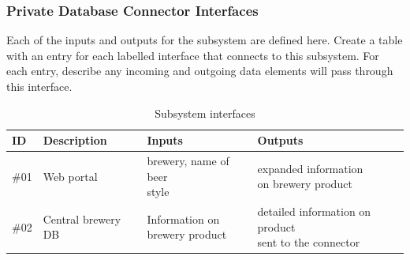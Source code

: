 \subsubsection{Private Database Connector Interfaces}
Each of the inputs and outputs for the subsystem are defined here. Create a table with an entry for each labelled interface that connects to this subsystem. For each entry, describe any incoming and outgoing data elements will pass through this interface.

\begin {table}[H]
\caption {Subsystem interfaces} 
\begin{center}
    \begin{tabular}{ | p{1cm} | p{6cm} | p{3cm} | p{3cm} |}
    \hline
    ID & Description & Inputs & Outputs \\ \hline
    \#01 & Web portal & \pbox{3cm}{brewery, name of beer \\ style} & \pbox{3cm}{expanded information \\ on brewery product}  \\ \hline
    \#02 & Central brewery DB & \pbox{3cm}{Information on \\ brewery product} & \pbox{3cm}{detailed information on product \\ sent to the connector}  \\ \hline
    \end{tabular}
\end{center}
\end{table}
